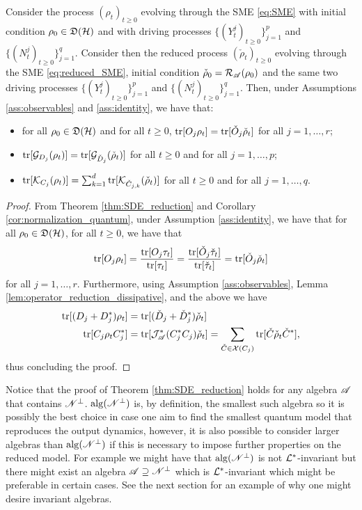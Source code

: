\documentclass[aihp,12pt]{imsart}
\begin{document}
\begin{theorem}
    \label{thm:linear_solves_prob_1}
    Consider the process $(\rho_t)_{t\geq0}$ evolving through the SME \eqref{eq:SME} with initial condition $\rho_0\in\mathfrak{D}(\mathcal{H})$ and with driving processes $\{(Y_t^j)_{t\geq0}\}_{j=1}^p$ and $\{(N_t^j)_{t\geq0}\}_{j=1}^q$. Consider then the reduced process $(\check{\rho}_t)_{t\geq0}$ evolving through the SME \eqref{eq:reduced_SME}, initial condition $\check{\rho}_0=\mathcal{R}_{\mathscr{A}}(\rho_0)$ and the same two driving processes $\{(Y_t^j)_{t\geq0}\}_{j=1}^p$ and $\{(N_t^j)_{t\geq0}\}_{j=1}^q$. Then, under Assumptions \ref{ass:observables} and \ref{ass:identity}, we have that:
    \begin{itemize}
        \item for all $\rho_0\in\mathfrak{D}(\mathcal{H})$ and for all $t\geq0$, ${\rm tr}[O_j\rho_t]={\rm tr}[\check{O}_j \check{\rho}_t]$ for all $j=1,\dots,r$;
        \item ${\rm tr}[\mathcal{G}_{D_j}(\rho_t)] = {\rm tr}[\mathcal{G}_{\check{D}_j}(\check{\rho}_t)]$ for all $t\geq0$ and for all $j=1,\dots,p$;
        \item ${\rm tr}[\mathcal{K}_{C_j}(\rho_t)] = \sum_{k=1}^{d} {\rm tr}[\mathcal{K}_{\check{C}_{j,k}}(\check{\rho}_t)]$ for all $t\geq0$ and for all $j=1,\dots,q$.
    \end{itemize} 
\end{theorem}
\begin{proof}
    From Theorem \ref{thm:SDE_reduction} and Corollary \ref{cor:normalization_quantum}, under Assumption \ref{ass:identity}, we have that for all $\rho_0\in\mathfrak{D}(\mathcal{H})$, for all $t\geq0$, we have that \[{\rm tr}[O_j \rho_t] = \frac{{\rm tr}[O_j \tau_t]}{{\rm tr}[\tau_t]} = \frac{{\rm tr}[\check{O}_j \check{\tau}_t]}{{\rm tr}[\check{\tau}_t]} = {\rm tr}[\check{O}_j\check{\rho}_t]\]
    for all $j=1,\dots,r$. Furthermore, using Assumption \ref{ass:observables}, Lemma \ref{lem:operator_reduction_dissipative}, and the above we have 
    \begin{align*}
        {\rm tr}[(D_j+D_j^*)\rho_t] &= {\rm tr}[(\check{D}_j+\check{D}_j^*)\check{\rho}_t]\\
        {\rm tr}[C_j\rho_t C_j^*] &= {\rm tr}[\mathcal{J}_{\mathscr{A}}^*(C_j^* C_j)\check{\rho}_t] = \sum_{\check{C}\in\mathcal{X}(C_j)}{\rm tr}[\check{C}\check{\rho}_t\check{C}^*],
    \end{align*}
    thus concluding the proof.
\end{proof}

\begin{remark}
    Notice that the proof of Theorem \ref{thm:SDE_reduction} holds for any algebra $\mathscr{A}$ that contains $\mathscr{N}^\perp$. ${\rm alg}(\mathscr{N}^\perp)$ is, by definition, the smallest such algebra so it is possibly the best choice in case one aim to find the smallest quantum model that reproduces the output dynamics, however, it is also possible to consider larger algebras than ${\rm alg}(\mathscr{N}^\perp)$ if this is necessary to impose further properties on the reduced model. For example we might have that ${\rm alg}(\mathscr{N}^\perp)$ is not $\mathcal{L}^*$-invariant but there might exist an algebra $\mathscr{A}\supseteq\mathscr{N}^\perp$ which is $\mathcal{L}^*$-invariant which might be preferable in certain cases. See the next section for an example of why one might desire invariant algebras. 
\end{remark}
\end{document}
